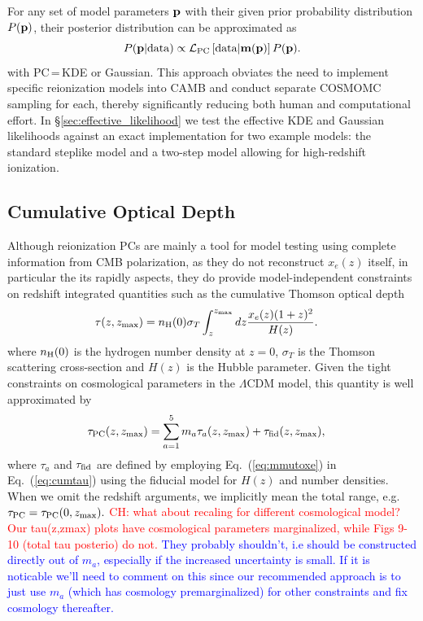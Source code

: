 \documentclass[prd,twocolumn,amsmath,amssymb,floatfix,superscriptaddress,nofootinbib]{revtex4-1}
\newcommand{\wh}[1]{\textcolor{blue}{#1}}
\newcommand{\ch}[1]{\textcolor{red}{#1}}
\begin{document}
For any set of model parameters ${\bf p}$ with their given prior probability distribution
$P({\bf p})$, their posterior distribution can be approximated as 
\begin{equation}
P({\bf p}| {\rm data}) \propto {\cal L}_{\rm PC}\left[ {\rm data}|\mathbf{m}(\bf p) \right] P(\bf p).
\end{equation}
with PC\,=\,KDE or Gaussian.
This approach obviates the need to implement specific reionization models into CAMB and conduct separate COSMOMC sampling for each, thereby significantly reducing both human and computational effort.
In \S\ref{sec:effective_likelihood} we test the effective KDE and Gaussian likelihoods against an exact implementation
for two example models: the standard steplike model and a two-step model allowing for high-redshift ionization.


%
%
%
 
\subsection{Cumulative Optical Depth}
\label{sec:cumulative}

Although reionization PCs are mainly a tool for model testing using complete information from CMB polarization, as they do not reconstruct $x_e(z)$ itself, in particular the its rapidly  aspects, they do provide model-independent constraints on redshift integrated quantities such as  the cumulative Thomson optical depth
\begin{align}
\tau(z,z_{\rm max}) & = n_{\rm H}(0) \sigma_T \int_z^{z_{\rm max}} dz \frac{x_e(z) (1+z)^{2} }{H(z)}.
\label{eq:cumtau}
\end{align}
where $n_{\rm H}(0)$ is the hydrogen number density at $z=0$, $\sigma_T$ is the Thomson scattering cross-section and $H(z)$ is the Hubble parameter. 
Given the tight constraints on cosmological parameters in the $\Lambda$CDM model, this quantity is well approximated by
\begin{align}
\tau_{\rm PC}(z,z_{\rm max})& = \sum_{a=1}^5 m_a \tau_a(z,z_{\rm max}) + \tau_{\rm fid}(z,z_{\rm max}),
\label{eq:cumtauPC}
\end{align}
where $\tau_a$ and $\tau_{\rm fid}$ are defined by employing Eq.~({\ref{eq:mmutoxe}}) in
Eq.~(\ref{eq:cumtau}) using the fiducial model 
for $H(z)$ and number densities.
 When we omit the redshift arguments, we
implicitly mean the total range, e.g. 
 $
 \tau_{\rm PC}=\tau_{\rm PC}(0,z_{\rm max}).
 $
 \ch{CH: what about recaling for different cosmological model? Our tau(z,zmax) plots have cosmological parameters marginalized, while Figs 9-10 (total tau posterio) do not.}
 \wh{They probably shouldn't, i.e should be constructed directly out of $m_a$, especially if the increased uncertainty is small.   If it is noticable we'll need to comment on this since our recommended approach is to just use $m_a$ (which has cosmology premarginalized)
 for other constraints and fix cosmology thereafter.}
 
\end{document}
